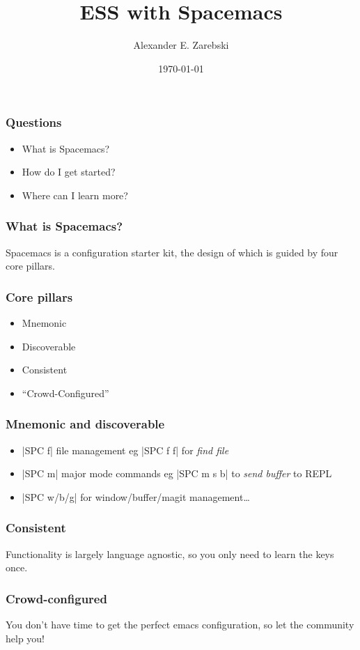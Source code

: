 \documentclass[presentation]{beamer}
\author{Alexander E. Zarebski}
\date{\today}
\title{ESS with Spacemacs}
\begin{document}
\maketitle

\begin{frame}
  \frametitle{Questions}
  \begin{itemize}
  \item What is Spacemacs?
  \item How do I get started?
  \item Where can I learn more?
  \end{itemize}
\end{frame}

\begin{frame}
  \frametitle{What is Spacemacs?}
  Spacemacs is a configuration starter kit, the design of which is guided by four
  core pillars.
\end{frame}

\begin{frame}
  \frametitle{Core pillars}
 \begin{itemize}
 \item Mnemonic
 \item Discoverable
 \item Consistent
 \item ``Crowd-Configured''
 \end{itemize} 
\end{frame}


\begin{frame}[fragile]
  \frametitle{Mnemonic and discoverable}

  \begin{itemize}
  \item \bverb|SPC f| file management eg \bverb|SPC f f| for \emph{find file}
  \item \bverb|SPC m| major mode commands eg \bverb|SPC m s b| to \emph{send buffer} to REPL
  \item \bverb|SPC w/b/g| for window/buffer/magit management\dots
  \end{itemize} 
\end{frame}


  \begin{frame}
    \frametitle{Consistent}
    Functionality is largely language agnostic, so you only need to learn the
    keys once.
  \end{frame}


  \begin{frame}
    \frametitle{Crowd-configured}
    You don't have time to get the perfect emacs configuration, so let the
    community help you!
  \end{frame}
\end{document}
